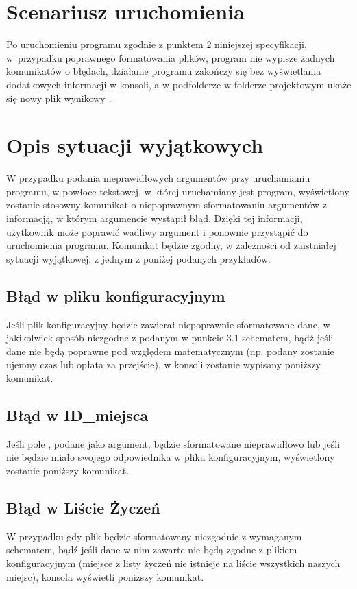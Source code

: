 \documentclass[12pt,a4paper]{article}
\begin{document}
\section{Scenariusz uruchomienia}
Po uruchomieniu programu zgodnie z punktem 2 niniejszej specyfikacji, w~przypadku poprawnego formatowania plików, program nie wypisze żadnych komunikatów o błędach, działanie programu zakończy się bez wyświetlania dodatkowych informacji w konsoli, a w podfolderze  w folderze projektowym ukaże się nowy plik wynikowy .
\section{Opis sytuacji wyjątkowych}
W przypadku podania nieprawidłowych argumentów przy uruchamianiu programu, w powłoce tekstowej, w której uruchamiany jest program, wyświetlony zostanie stosowny komunikat o niepoprawnym sformatowaniu argumentów z informacją, w którym argumencie wystąpił błąd. Dzięki tej informacji, użytkownik może poprawić wadliwy argument i ponownie przystąpić do uruchomienia programu. Komunikat będzie zgodny, w zależności od zaistniałej sytuacji wyjątkowej, z jednym z poniżej podanych przykładów.
\subsection{Błąd w pliku konfiguracyjnym}
Jeśli plik konfiguracyjny będzie zawierał niepoprawnie sformatowane dane, w jakikolwiek sposób niezgodne z podanym w punkcie 3.1 schematem, bądź jeśli dane nie będą poprawne pod względem matematycznym (np. podany zostanie ujemny czas lub opłata za przejście), w konsoli zostanie wypisany poniższy komunikat.\\
{\footnotesize{}}
\subsection{Błąd w ID\_miejsca}
Jeśli pole , podane jako argument, będzie sformatowane nieprawidłowo lub jeśli nie będzie miało swojego odpowiednika w pliku konfiguracyjnym, wyświetlony zostanie poniższy komunikat.\\
\subsection{Błąd w Liście Życzeń}
W przypadku gdy plik  będzie sformatowany niezgodnie z wymaganym schematem, bądź jeśli dane w nim zawarte nie będą zgodne z plikiem konfiguracyjnym (miejsce z listy życzeń nie istnieje na liście wszystkich naszych miejsc), konsola wyświetli poniższy komunikat.\\
\end{document}
